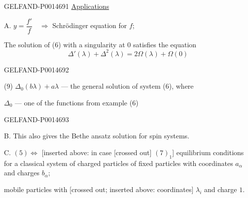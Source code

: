 \begin{GelfandAdjacentEvidence}{GELFAND-P001469}{1}
\underline{Applications}

A. \(y=\dfrac{f'}{f}\quad\Rightarrow\) Schrödinger equation for \(f\);

The solution of (6) with a singularity at \(0\) satisfies the equation
\begin{equation*}
\Delta'(\lambda)+\Delta^2(\lambda)=2\Omega(\lambda)+\Omega(0)
\tag{8}
\end{equation*}

\end{GelfandAdjacentEvidence}
\begin{GelfandAdjacentEvidence}{GELFAND-P001469}{2}


(9) \(\Delta_0(b\lambda)+a\lambda\) --- the general solution of system (6), where

\(\Delta_0\) --- one of the functions from example (6)
\end{GelfandAdjacentEvidence}
\begin{GelfandAdjacentEvidence}{GELFAND-P001469}{3}


B. This also gives the Bethe ansatz solution for spin systems.

C. \((5)\Leftrightarrow\)
[inserted above: in case [crossed out] \((7)_1\)]
equilibrium conditions for a classical system of charged particles of
 fixed particles with coordinates \(a_\alpha\) and charges \(b_\alpha\);

mobile particles with [crossed out; inserted above: coordinates] \(\lambda_i\) and charge \(1\).
\end{GelfandAdjacentEvidence}
